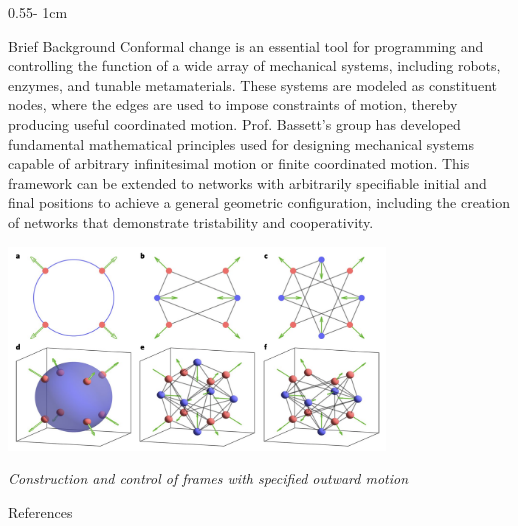 \documentclass{../psuposter}
\begin{document}
\begin{frame}
\begin{columns}[t, totalwidth=\textwidth]
\begin{column}{0.55\textwidth - 1cm}
    \begin{block}{Brief Background}
    	Conformal change is an essential tool for programming and controlling the function of a wide array of mechanical systems, including robots, enzymes, and tunable metamaterials. These systems are modeled as constituent nodes, where the edges are used to impose constraints of motion, thereby producing useful coordinated motion. Prof. Bassett's group has developed fundamental mathematical principles used for designing mechanical systems capable of arbitrary infinitesimal motion or finite coordinated motion. This framework can be extended to networks with arbitrarily specifiable initial and final positions to achieve a general geometric configuration, including the creation of networks that demonstrate tristability and cooperativity.
    	\cite{kimConformationalControlMechanical2019} 
        \begin{center}
		   	\includegraphics[width=0.75\textwidth]{images/background}    
		
		\textit{Construction and control of frames with specified outward motion} \cite{kimConformationalControlMechanical2019}
    	\end{center}
    \end{block}


    \begin{block}{References}
        
%        
		
    \end{block}

\end{column}
\end{columns}



\end{frame}
\end{document}
